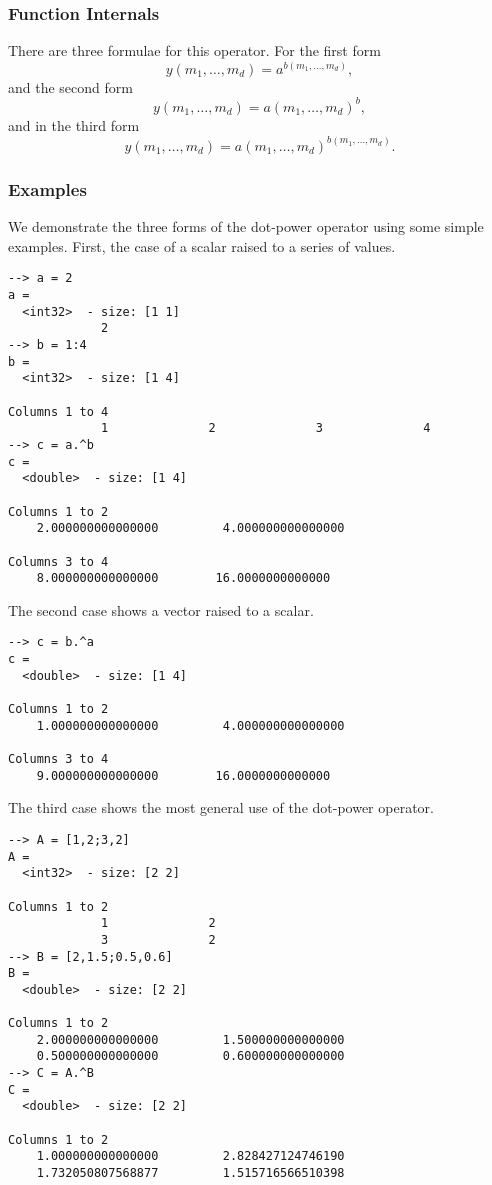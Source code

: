 \subsubsection{Function Internals}
There are three formulae for this operator.  For the first form
\[
y(m_1,\ldots,m_d) = a^{b(m_1,\ldots,m_d)},
\]
and the second form
\[
y(m_1,\ldots,m_d) = a(m_1,\ldots,m_d)^b,
\]
and in the third form
\[
y(m_1,\ldots,m_d) = a(m_1,\ldots,m_d)^{b(m_1,\ldots,m_d)}.
\]
\subsubsection{Examples}
We demonstrate the three forms of the dot-power operator using some simple examples.  First, the case of a scalar raised to a series of values.
\begin{verbatim}
--> a = 2
a =
  <int32>  - size: [1 1]
             2
--> b = 1:4
b =
  <int32>  - size: [1 4]
  
Columns 1 to 4
             1              2              3              4
--> c = a.^b
c =
  <double>  - size: [1 4]
  
Columns 1 to 2
    2.000000000000000         4.000000000000000
  
Columns 3 to 4
    8.000000000000000        16.0000000000000
\end{verbatim}
The second case shows a vector raised to a scalar.
\begin{verbatim}
--> c = b.^a
c =
  <double>  - size: [1 4]
  
Columns 1 to 2
    1.000000000000000         4.000000000000000
  
Columns 3 to 4
    9.000000000000000        16.0000000000000
\end{verbatim}
The third case shows the most general use of the dot-power operator.
\begin{verbatim}
--> A = [1,2;3,2]
A =
  <int32>  - size: [2 2]
  
Columns 1 to 2
             1              2
             3              2
--> B = [2,1.5;0.5,0.6]
B =
  <double>  - size: [2 2]
  
Columns 1 to 2
    2.000000000000000         1.500000000000000
    0.500000000000000         0.600000000000000
--> C = A.^B
C =
  <double>  - size: [2 2]
  
Columns 1 to 2
    1.000000000000000         2.828427124746190
    1.732050807568877         1.515716566510398
\end{verbatim}
